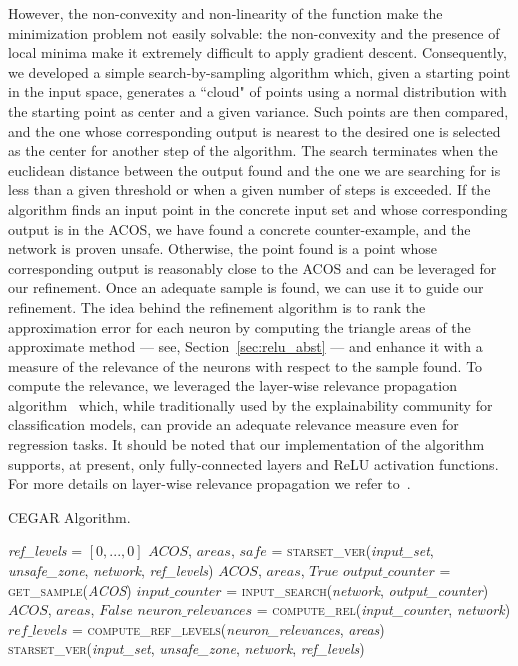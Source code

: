 However, the non-convexity and non-linearity of the function make the minimization 
problem not easily solvable: the non-convexity and the presence of 
local minima make it extremely difficult to apply gradient descent. 
Consequently, we developed a simple search-by-sampling algorithm which, given a 
starting point in the input space, generates a ``cloud" of points using a normal 
distribution with the starting point as center and a given variance. Such points 
are then compared, and the one whose corresponding output is nearest to the desired 
one is selected as the center for another step of the algorithm. The search terminates 
when the euclidean distance between the output found and the one we are searching for 
is less than a given threshold or when a given number of steps is exceeded.
If the algorithm finds an input point in the concrete input set and whose 
corresponding output is in the ACOS, we have found a concrete counter-example, and 
the network is proven unsafe. Otherwise, the point found is a point whose corresponding
output is reasonably close to the ACOS and can be leveraged for our refinement.
%
Once an adequate sample is found, we can use it to guide our refinement. 
The idea behind the refinement algorithm is to rank the approximation error
for each neuron by computing the triangle areas of the approximate method 
--- see, Section~\ref{sec:relu_abst} --- and enhance it with a measure of the 
relevance of the neurons with respect to the sample found. 
To compute the relevance, we leveraged the layer-wise relevance propagation 
algorithm~\cite{DBLP:journals/corr/SamekMBLM16} which, while traditionally used 
by the explainability community for classification models, can provide an adequate
relevance measure even for regression tasks. It should be noted that our 
implementation of the algorithm supports, at present, only fully-connected layers 
and ReLU activation functions. For more details on layer-wise relevance propagation 
we refer to~\cite{DBLP:series/lncs/MontavonBLSM19}. 
%
%
%
\begin{algorithm}[t]
	\caption{CEGAR Algorithm.}
	\label{alg:ref-abst}
	\begin{algorithmic}[1]
		\State \emph{ref\_levels} = $[0, ..., 0]$
		\State $ACOS$, $areas$, $safe$ = \textsc{starset\_ver}(\emph{input\_set}, \emph{unsafe\_zone}, \emph{network}, \emph{ref\_levels})
		\State \Return $ACOS$, $areas$, $True$
		\EndIf
		\Statex
		\State $output\_counter$ = \textsc{get\_sample}(\emph{ACOS})
		\State $input\_counter$ = \textsc{input\_search}(\emph{network}, \emph{output\_counter})
		\State \Return $ACOS$, $areas$, $False$
		\EndIf
		\Statex
		\State $neuron\_relevances$ = \textsc{compute\_rel}(\emph{input\_counter}, \emph{network})
		\State $ref\_levels$ = \textsc{compute\_ref\_levels}(\emph{neuron\_relevances}, \emph{areas})
		\State \Return \textsc{starset\_ver}(\emph{input\_set}, \emph{unsafe\_zone}, \emph{network}, \emph{ref\_levels})
		\EndFunction
	\end{algorithmic}
\end{algorithm}
%
%

